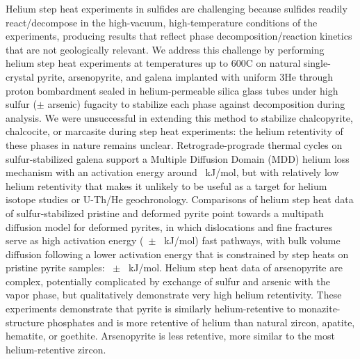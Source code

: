 Helium step heat experiments in sulfides are challenging because
sulfides readily react/decompose in the high-vacuum, high-temperature
conditions of the experiments, producing results that reflect phase
decomposition/reaction kinetics that are not geologically relevant. We
address this challenge by performing helium step heat experiments at
temperatures up to 600\textdegree C on natural single-crystal pyrite, arsenopyrite,
and galena implanted with uniform 3He through proton bombardment sealed
in helium-permeable silica glass tubes under high sulfur ($\pm$
arsenic) fugacity to stabilize each phase against decomposition during analysis. We
were unsuccessful in extending this method to stabilize chalcopyrite,
chalcocite, or marcasite during step heat experiments: the helium
retentivity of these phases in nature remains unclear.
Retrograde-prograde thermal cycles on sulfur-stabilized galena support a
Multiple Diffusion Domain (MDD) helium loss mechanism with an activation
energy around \ChThreeCCpEa\ kJ/mol, but with relatively low helium retentivity 
that makes it unlikely to be useful as a target for helium isotope studies or U-Th/He geochronology.  
Comparisons of helium step heat data of
sulfur-stabilized pristine and deformed pyrite point towards a multipath
diffusion model for deformed pyrites, in which dislocations and fine fractures serve as high
activation energy (\ChThreeRustEa\ $\pm$ \ChThreeRustEaErr\ kJ/mol) fast
pathways, with bulk volume diffusion following a
lower activation energy that is constrained by step heats on pristine pyrite samples: \ChThreeLVCOEa\ $\pm$ \ChThreeLVCOEaErr\
kJ/mol. Helium step heat data of arsenopyrite are complex, potentially
complicated by exchange of sulfur and arsenic with the vapor phase, but
qualitatively demonstrate very high helium retentivity. These
experiments demonstrate that pyrite is similarly
helium-retentive to monazite-structure phosphates and is more
retentive of helium than natural zircon, apatite, hematite, or goethite. Arsenopyrite
is less retentive, more similar to the most helium-retentive zircon. 
